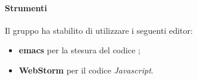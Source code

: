                 \paragraph*{Strumenti}
                Il gruppo ha stabilito di utilizzare i seguenti editor:
                \begin{itemize}
                  \item \textbf{emacs} per la stesura del codice ;    %
                  \item \textbf{WebStorm} per il codice \textit{Javascript}.      %
                \end{itemize}
